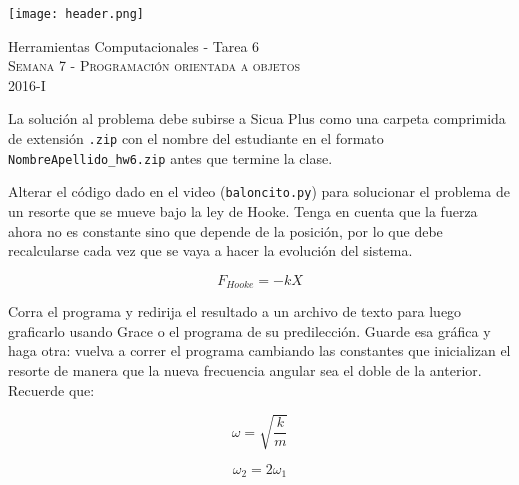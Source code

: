 \documentclass[11pt,letterpaper]{exam}
\begin{document}
\begin{center}

\texttt{[image: header.png]}

\vspace{1.0cm}
{\Large Herramientas Computacionales - Tarea 6} \\
\textsc{Semana 7 - Programaci\'on orientada a objetos}\\
2016-I\\
\end{center}



\vspace{0.5cm}

\noindent
La soluci\'on al problema debe subirse a Sicua Plus como una carpeta comprimida de extensi\'on \verb".zip" con el nombre del estudiante en el formato \verb"NombreApellido_hw6.zip" antes que termine la clase.

\vspace{0.5cm}

\begin{questions}
 

Alterar el c\'odigo dado en el video (\verb"baloncito.py") para solucionar el problema de un resorte que se mueve bajo la ley de Hooke. Tenga en cuenta que la fuerza ahora no es constante sino que depende de la posici\'on, por lo que debe recalcularse cada vez que se vaya a hacer la evoluci\'on del sistema.

\begin{equation}
F_{Hooke}=-kX
\end{equation}



Corra el programa y redirija el resultado a un archivo de texto para luego graficarlo usando Grace o el programa de su predilecci\'on. Guarde esa gr\'afica y haga otra: vuelva a correr el programa cambiando las constantes que inicializan el resorte de manera que la nueva frecuencia angular sea el doble de la anterior. Recuerde que:


\begin{equation}
\omega=\sqrt{\frac{k}{m}}
\end{equation}

\begin{equation}
\omega_{2}=2\omega_{1}
\end{equation}


\end{questions}
\end{document}
